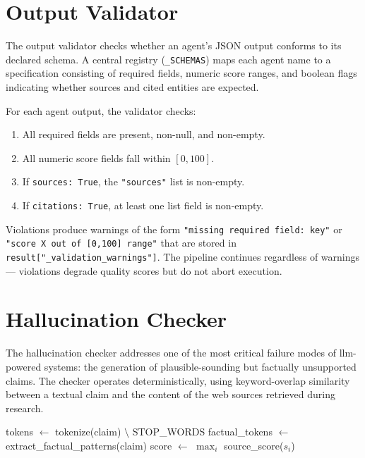 \documentclass[12pt,a4paper,oneside]{book}
\begin{document}
\section{Output Validator}

The output validator checks whether an agent's JSON output conforms to its declared schema. A central registry (\texttt{\_SCHEMAS}) maps each agent name to a specification consisting of required fields, numeric score ranges, and boolean flags indicating whether sources and cited entities are expected.

For each agent output, the validator checks:
\begin{enumerate}
  \item All required fields are present, non-null, and non-empty.
  \item All numeric score fields fall within $[0, 100]$.
  \item If \texttt{sources: True}, the \texttt{"sources"} list is non-empty.
  \item If \texttt{citations: True}, at least one list field is non-empty.
\end{enumerate}

Violations produce warnings of the form \texttt{"missing required field: key"} or \texttt{"score X out of [0,100] range"} that are stored in \texttt{result["\_validation\_warnings"]}. The pipeline continues regardless of warnings — violations degrade quality scores but do not abort execution.

\section{Hallucination Checker}

The hallucination checker addresses one of the most critical failure modes of \gls{llm}-powered systems: the generation of plausible-sounding but factually unsupported claims. The checker operates deterministically, using keyword-overlap similarity between a textual claim and the content of the web sources retrieved during research.

\begin{algorithm}[H]
\SetAlgoLined
{}
tokens $\leftarrow$ tokenize(claim) $\setminus$ STOP\_WORDS\;
factual\_tokens $\leftarrow$ extract\_factual\_patterns(claim)\;
score $\leftarrow$ $\max_i$ source\_score($s_i$)\;
{}
\;
\caption{Hallucination check for a single claim}
\label{alg:hallucination}
\end{algorithm}
\end{document}
